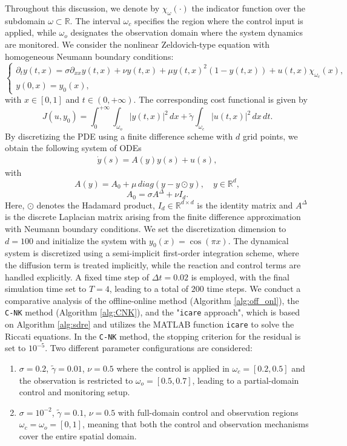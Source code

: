 \documentclass{article}
\begin{document}
Throughout this discussion, we denote by $\chi_{\omega}(\cdot)$ the indicator function over the subdomain $\omega \subset \mathbb{R}$. The interval $\omega_c$ specifies the region where the control input is applied, while $\omega_o$ designates the observation domain where the system dynamics are monitored.
We consider the nonlinear Zeldovich-type equation with homogeneous Neumann boundary conditions:
\begin{equation*}
\left\{ \begin{array}{l}
\partial_t y(t,x) = \sigma \partial_{xx} y(t,x) + \nu y(t,x)+ \mu y(t,x)^2 (1-y(t,x)) + u(t,x)\chi_{\omega_c}(x),  \\
 y(0,x)=y_0(x),
\end{array} \right.
\label{AC}
\end{equation*}
with $x \in [0,1]$ and $t \in (0,+\infty)$. The corresponding cost functional is given by
$$
 J(u,y_0) = \int_0^{+\infty} \int_{\omega_o} | y(t,x)|^2 \, dx + \tilde{\gamma} \int_{\omega_c} | u(t,x) |^2 \, dx \, dt.
$$
By discretizing the PDE using a finite difference scheme with $d$ grid points, we obtain the following system of ODEs 
\begin{align*}
\dot{y}(s)=A(y) y(s) + u(s),
\end{align*}
with
$$
A(y) = A_0 +  \mu \, diag(y-y \odot y),\quad y \in \mathbb{R}^d,
$$
$$
A_0 = \sigma A^{\Delta} + \nu I_d.
$$
Here, $\odot$ denotes the Hadamard product, $I_d \in \mathbb{R}^{d \times d}$ is the identity matrix and $A^{\Delta}$ is the discrete Laplacian matrix arising from the finite difference approximation with Neumann boundary conditions. We set the discretization dimension to $d =100$ and initialize the system with $y_0(x) = \cos (\pi x)$. The dynamical system is discretized using a semi-implicit first-order integration scheme, where the diffusion term is treated implicitly, while the reaction and control terms are handled explicitly. A fixed time step of $\Delta t = 0.02$ is employed, with the final simulation time set to $T=4$, leading to a total of $200$ time steps. We conduct a comparative analysis of the offline-online method (Algorithm \ref{alg:off_onl}), the \texttt{C-NK} method (Algorithm \ref{alg:CNK}), and the "\texttt{icare} approach", which is based on Algorithm \ref{alg:sdre} and utilizes the MATLAB function \texttt{icare} to solve the Riccati equations. In the \texttt{C-NK} method, the stopping criterion for the residual is set to $10^{-5}$. Two different parameter configurations are considered:
\begin{enumerate}
    \item $\sigma = 0.2$, $\tilde{\gamma} = 0.01$, $\nu = 0.5$ where the control is applied in $\omega_c= [0.2,0.5] $ and the observation is restricted to $ \omega_o = [0.5,0.7]$, leading to a partial-domain control and monitoring setup.
    \item $\sigma = 10^{-2}$, $\tilde{\gamma} = 0.1$, $\nu = 0.5$ with full-domain control and observation regions $\omega_c = \omega_o = [0,1]$, meaning that both the control and observation mechanisms cover the entire spatial domain.
\end{enumerate}
\end{document}
